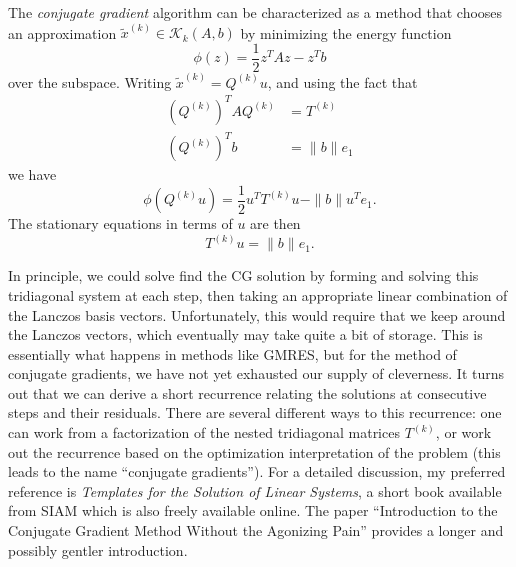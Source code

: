 \documentclass[12pt, leqno]{article}
\newcommand{\calK}{\mathcal{K}}
\begin{document}
The {\em conjugate gradient} algorithm can be characterized as
a method that chooses an approximation
$\tilde{x}^{(k)} \in \calK_k(A,b)$ by minimizing the energy
function
\[
  \phi(z) = \frac{1}{2} z^T A z - z^T b
\]
over the subspace.  Writing $\tilde{x}^{(k)} = Q^{(k)} u$,
and using the fact that
\begin{align*}
  (Q^{(k)})^T A Q^{(k)} & = T^{(k)} \\
  (Q^{(k)})^T b &= \|b\| e_1
\end{align*}
we have
\[
  \phi(Q^{(k)} u) = \frac{1}{2} u^T T^{(k)} u - \|b\| u^T e_1.
\]
The stationary equations in terms of $u$ are then
\[
  T^{(k)} u = \|b\| e_1.
\]

In principle, we could solve find the CG solution by forming and
solving this tridiagonal system at each step, then taking an
appropriate linear combination of the Lanczos basis vectors.
Unfortunately, this would require that we keep around the Lanczos
vectors, which eventually may take quite a bit of storage.
This is essentially what happens in methods like GMRES, but
for the method of conjugate gradients, we have not yet exhausted
our supply of cleverness.  It turns out that we can derive a short
recurrence relating the solutions at consecutive steps and their
residuals.  There are several different ways to this recurrence:
one can work from a factorization of the nested tridiagonal matrices
$T^{(k)}$, or work out the recurrence based on the optimization
interpretation of the problem (this leads to the name ``conjugate
gradients'').  For a detailed discussion, my preferred reference
is {\em Templates for the Solution of Linear Systems},
a short book available from SIAM which is also freely available
online.  The paper ``Introduction to the Conjugate Gradient
Method Without the Agonizing Pain'' provides a longer and possibly
gentler introduction.
\end{document}
